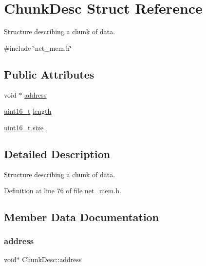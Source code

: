 \hypertarget{structChunkDesc}{}\section{Chunk\+Desc Struct Reference}
\label{structChunkDesc}


Structure describing a chunk of data.  




{\ttfamily \#include \char`\"{}net\+\_\+mem.\+h\char`\"{}}

\subsection*{Public Attributes}
\begin{DoxyCompactItemize}
\item 
void $\ast$ \hyperlink{structChunkDesc_a014aac6efdc5722e058a9b67ca5f8358}{address}
\item 
\hyperlink{stdint_8h_a273cf69d639a59973b6019625df33e30}{uint16\+\_\+t} \hyperlink{structChunkDesc_a4bdd57a9363511126fe5cd6d30c51c81}{length}
\item 
\hyperlink{stdint_8h_a273cf69d639a59973b6019625df33e30}{uint16\+\_\+t} \hyperlink{structChunkDesc_ab06232d65ee252651962c202651910c4}{size}
\end{DoxyCompactItemize}


\subsection{Detailed Description}
Structure describing a chunk of data. 

Definition at line 76 of file net\+\_\+mem.\+h.



\subsection{Member Data Documentation}
\mbox{\label{structChunkDesc_a014aac6efdc5722e058a9b67ca5f8358}} 
\subsubsection{\texorpdfstring{address}{address}}
{\footnotesize\ttfamily void$\ast$ Chunk\+Desc\+::address}



